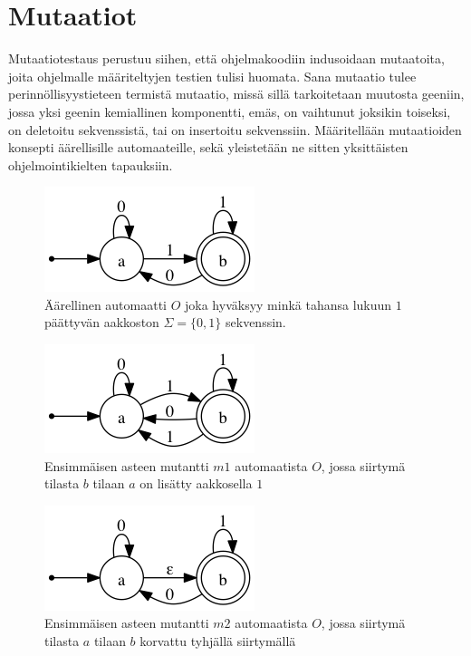 \documentclass[finnish]{tktltiki2}
\begin{document}
\section{Mutaatiot}
Mutaatiotestaus perustuu siihen, että ohjelmakoodiin indusoidaan mutaatoita, joita ohjelmalle määriteltyjen testien tulisi huomata. Sana mutaatio tulee perinnöllisyystieteen termistä mutaatio, missä sillä tarkoitetaan muutosta geeniin, jossa yksi geenin kemiallinen komponentti, emäs, on vaihtunut joksikin toiseksi, on deletoitu sekvenssistä, tai on insertoitu sekvenssiin. Määritellään mutaatioiden konsepti äärellisille automaateille, sekä yleistetään ne sitten yksittäisten ohjelmointikielten tapauksiin.

\begin{figure}[here]
\centering
\caption{Äärellinen automaatti $O$ joka hyväksyy minkä tahansa lukuun $1$ päättyvän aakkoston $\Sigma = \{0,1\}$ sekvenssin.}
\label{fig:nfa}
\includegraphics[scale=0.6]{automaatit/nfa.png}
\end{figure}

\begin{figure}[here]
\centering
\caption{Ensimmäisen asteen mutantti $m1$ automaatista $O$, jossa siirtymä tilasta $b$ tilaan $a$ on lisätty aakkosella $1$}
\label{fig:m1}
\includegraphics[scale=0.6]{automaatit/m1.png}
\end{figure}

\begin{figure}[here]
\centering
\caption{Ensimmäisen asteen mutantti $m2$ automaatista $O$, jossa siirtymä tilasta $a$ tilaan $b$ korvattu tyhjällä siirtymällä}
\label{fig:m2}
\includegraphics[scale=0.6]{automaatit/m2.png}
\end{figure}
\end{document}
